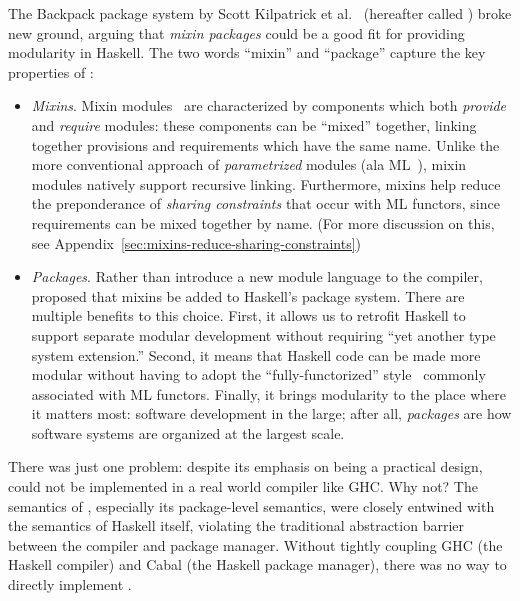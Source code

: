 The Backpack package system by Scott Kilpatrick et al.~\cite{backpack}
(hereafter called \OldBackpack{}) broke new ground, arguing that \emph{mixin
packages} could be a good fit for providing modularity in Haskell.
The two words ``mixin'' and ``package'' capture the key properties of \OldBackpack{}:

\begin{itemize}
    \item \emph{Mixins}. Mixin modules~\cite{bracha+:modularity,ancona+:cms,flatt+:units,duggan:mixin} are characterized by components which both \emph{provide} and \emph{require}
    modules:  these components can be ``mixed'' together, linking
    together provisions and requirements which have
    the same name.  Unlike the more conventional approach of
    \emph{parametrized} modules (ala ML~\cite{milner+:def-of-sml-revised}),
    mixin modules natively support recursive linking.
    Furthermore, mixins help reduce
    the preponderance of \emph{sharing constraints} that occur with ML
    functors, since requirements can be mixed together by name.
    (For more discussion on this, see Appendix~\ref{sec:mixins-reduce-sharing-constraints})

    \item \emph{Packages}. Rather than introduce a new module language
    to the compiler, \OldBackpack{} proposed that mixins be added to
    Haskell's package system.  There are multiple benefits to this choice.
    First, it allows us to retrofit Haskell to support separate modular
    development without requiring ``yet another type system extension.''
    Second, it means that Haskell code can be made more
    modular without having to adopt the ``fully-functorized'' style~\cite{structabshotlang}
    commonly associated with ML functors.
    Finally, it brings modularity to the place where it matters most:
    software development in the large;  after all, \emph{packages} are how
    software systems are organized at the largest scale.
\end{itemize}
%
There was just one problem: despite its emphasis on being a practical
design, \OldBackpack{} could not be implemented in a real world compiler
like GHC\@.  Why not? The
semantics of \OldBackpack{}, especially its package-level semantics,
were closely entwined with the semantics of Haskell itself,  violating
the traditional abstraction barrier between the compiler and package
manager.  Without tightly coupling GHC (the Haskell compiler) and Cabal
(the Haskell package manager), there was no way to directly implement
\OldBackpack{}.

